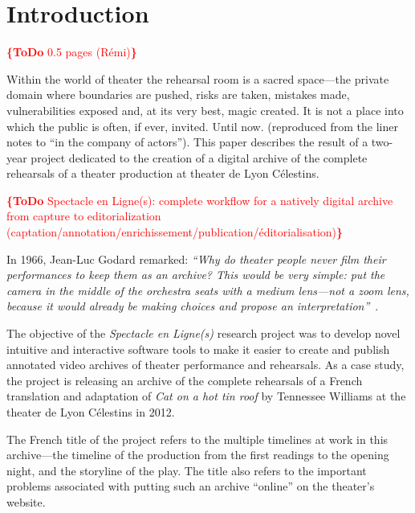 \documentclass[conference]{IEEEtran}
\newcommand{\todo}[1]{\noindent\textcolor{red}{{\bf \{ToDo} #1{\bf \}}}}
\begin{document}
%
\IEEEpeerreviewmaketitle



\section{Introduction}

\todo{0.5 pages (Rémi)}

Within the world of theater the rehearsal room is a sacred space---the private domain where boundaries are pushed, risks are taken, mistakes made, vulnerabilities exposed and, at its very best, magic created. It is not a place into which the public is often, if ever, invited. Until now. (reproduced from the liner notes to ``in the company of actors''). This paper describes the result of a two-year project dedicated to the creation of a digital archive  of  the complete  rehearsals of a theater production at theater de Lyon Célestins.

\todo{Spectacle en Ligne(s): complete workflow for a natively digital archive from capture to editorialization
(captation/annotation/enrichissement/publication/éditorialisation)}

In 1966, Jean-Luc Godard remarked: {\em ``Why do theater people never film their performances to keep  them as an archive? This would be very simple: put the camera in the middle of the orchestra seats with a medium lens---not a zoom lens, because it would already be making choices and propose an interpretation''}~\cite{Godard66}.

The objective of the \emph{Spectacle en Ligne(s)} research project was to develop novel intuitive and interactive software tools to make it easier to 
create and publish annotated video archives of theater performance and rehearsals. As a case study, the project is releasing an archive of 
the complete rehearsals of a French translation and adaptation of \emph{Cat on a hot tin roof} by Tennessee Williams at the theater de Lyon Célestins
in 2012. 

The French title of the project refers to the multiple timelines at work in this archive---the timeline of the production from the first readings to the opening night, and the storyline of the play. The title also refers to the important problems associated with putting such an archive ``online'' on the theater's website.
\end{document}

